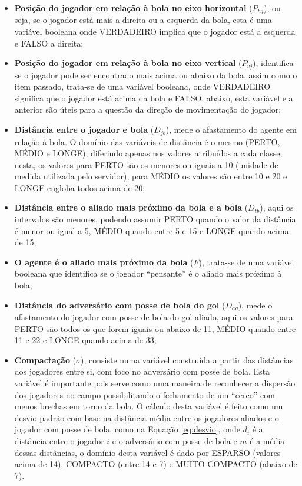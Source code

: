\begin{itemize}
    \item \textbf{Posição do jogador em relação à bola no eixo horizontal}
    ($P_{hj}$), ou seja, se o jogador está mais a direita ou a esquerda da
    bola, esta é uma variável booleana onde VERDADEIRO implica
    que o jogador está a esquerda e FALSO a direita;
    \item \textbf{Posição do jogador em relação à bola no eixo vertical}
    ($P_{vj}$), identifica se o jogador pode ser encontrado mais acima ou
    abaixo da bola, assim como o item passado, trata-se de uma variável
    booleana, onde VERDADEIRO significa que o jogador está acima da bola e FALSO, abaixo,
    esta variável e a anterior são úteis para a questão da direção de movimentação
    do jogador;
    \item \textbf{Distância entre o jogador e bola} ($D_{jb}$), mede o
    afastamento do agente em relação à bola. O domínio das
    variáveis de distância é o mesmo (PERTO, MÉDIO e LONGE), diferindo
    apenas nos valores atribuídos a cada classe, nesta, os valores para PERTO
    são os menores ou iguais a 10 (unidade de medida utilizada pelo servidor), para
    MÉDIO os valores são entre 10 e 20 e LONGE engloba todos acima de 20;
    \item \textbf{Distância entre o aliado mais próximo da bola e a bola}
    ($D_{tb}$), aqui os intervalos são menores, podendo assumir PERTO quando o
    valor da distância é menor ou igual a 5, MÉDIO quando entre 5 e 15 e LONGE
    quando acima de 15;
    \item \textbf{O agente é o aliado mais próximo da bola} ($F$), trata-se de
    uma variável booleana que identifica se o jogador ``pensante'' é o aliado
    mais próximo à bola;
    \item \textbf{Distância do adversário com posse de bola do gol} ($D_{ag}$),
    mede o afastamento do jogador com posse de bola do gol aliado, aqui os
    valores para PERTO são todos os que forem iguais ou abaixo de 11, MÉDIO
    quando entre 11 e 22 e LONGE quando acima de 33;
    \item \textbf{Compactação} ($\sigma$), consiste numa variável construída a
    partir das distâncias dos jogadores entre si, com foco no adversário com
    posse de bola. Esta variável é importante pois serve como uma maneira de
    reconhecer a dispersão dos jogadores no campo possibilitando o fechamento de
    um ``cerco'' com menos brechas em torno da bola. O cálculo desta variável é
    feito como um desvio padrão com base na distância média entre os jogadores
    aliados e o jogador com posse de bola, como na Equação \ref{eq:desvio}, onde
    $d_i$ é a distância entre o jogador $i$ e o adversário com posse de bola e
    $m$ é a média dessas distâncias, o domínio desta variável é dado por
    ESPARSO (valores acima de 14), COMPACTO (entre 14 e 7) e MUITO COMPACTO
    (abaixo de 7).
\end{itemize}

